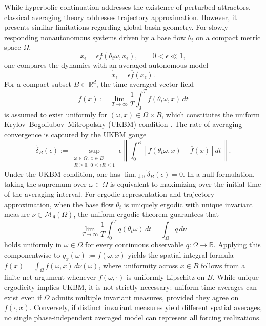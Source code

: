 \documentclass[pdflatex,sn-mathphys-num]{sn-jnl}
\numberwithin{equation}{section}
\theoremstyle{thmstyleone}%
\theoremstyle{definition}
\theoremstyle{remark}
\begin{document}
While hyperbolic continuation addresses the existence of perturbed attractors, classical averaging theory addresses trajectory approximation. However, it presents similar limitations regarding global basin geometry. For slowly responding nonautonomous systems driven by a base flow $\theta_t$ on a compact metric space $\Omega$,
\begin{equation}
\label{eq:slow-nonautonomous-system}
    \dot x_\epsilon = \epsilon f(\theta_t\omega, x_\epsilon), \qquad 0 < \epsilon \ll 1,
\end{equation}
one compares the dynamics with an averaged autonomous model
\begin{equation}
\label{eq:averaged-system}
    \dot{\overline x}_\epsilon = \epsilon\overline f(\overline x_\epsilon).
\end{equation}
For a compact subset $B \subset \mathbb{R}^d$, the time-averaged vector field
\[
    \overline f(x) := \lim_{T\to\infty} \frac{1}{T} \int_0^T f(\theta_t\omega, x)\,dt
\]
is assumed to exist uniformly for $(\omega,x) \in \Omega \times B$, which constitutes the uniform Krylov--Bogoliubov--Mitropolsky (UKBM) condition \citep{longo2025nonautonomous}. The rate of averaging convergence is captured by the UKBM gauge
\[
    \widetilde\delta_B(\epsilon) := \sup_{\substack{\omega\in\Omega,\ x\in B\\ R\ge 0,\ 0\le \epsilon R \le 1}} \epsilon \left\| \int_0^R \left[ f(\theta_t\omega, x) - \overline f(x) \right] dt \right\|.
\]
Under the UKBM condition, one has $\lim_{\epsilon\downarrow0}\widetilde\delta_B(\epsilon)=0$. In a hull formulation, taking the supremum over $\omega \in \Omega$ is equivalent to maximizing over the initial time of the averaging interval. For ergodic representation and trajectory approximation, when the base flow $\theta_t$ is uniquely ergodic with unique invariant measure $\nu \in \mathcal{M}_\theta(\Omega)$, the uniform ergodic theorem \citep{cornfeld2012ergodic,walters2000introduction} guarantees that
\[
    \lim_{T\to\infty} \frac{1}{T} \int_0^T q(\theta_t\omega)\,dt = \int_\Omega q\,d\nu
\]
holds uniformly in $\omega \in \Omega$ for every continuous observable $q: \Omega \to \mathbb{R}$. Applying this componentwise to $q_x(\omega) := f(\omega, x)$ yields the spatial integral formula $\overline f(x) = \int_\Omega f(\omega, x)\,d\nu(\omega)$, where uniformity across $x \in B$ follows from a finite-net argument whenever $f(\omega, \cdot)$ is uniformly Lipschitz on $B$. While unique ergodicity implies UKBM, it is not strictly necessary: uniform time averages can exist even if $\Omega$ admits multiple invariant measures, provided they agree on $f(\cdot, x)$. Conversely, if distinct invariant measures yield different spatial averages, no single phase-independent averaged model can represent all forcing realizations.
\end{document}

